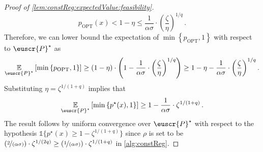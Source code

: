 \documentclass[11pt]{article}
\theoremstyle{plain}
\theoremstyle{definition}
\theoremstyle{remark}
\newcommand{\binbrace}[1]{\big\{#1\big\}}
\newcommand{\inbrace}[1]{\left\{#1\right\}}
\newcommand{\inparen}[1]{\left(#1\right)}
\newcommand{\insquare}[1]{\left[#1\right]}
\newcommand{\E}{\operatornamewithlimits{\mathbb{E}}}
\newcommand{\Ex}{\E}
\newcommand{\sfrac}[2]{{#1/#2}}
\newcommand{\nfrac}[2]{\nicefrac{#1}{#2}}
\newcommand{\opt}{\ensuremath{\mathrm{OPT}}}
\newcommand{\customcal}[1]{\euscr{#1}}
\newcommand{\cP}{\customcal{P}}
\newcommand{\cPtrue}{\cP^\star}
\begin{document}
\begin{proof}[Proof of \cref{lem:constReg:expectedValue:feasibility}]
\[{                    p_{\opt}(x) < 1-\eta
                }
                \leq {
                     \frac{1}{\alpha\sigma}  \cdot \inparen{\frac{\zeta}{\eta}}^{\sfrac{1}{q}}
                }
                \,.  
            \]
            Therefore, we can lower bound the expectation of $\min\inbrace{p_{\opt},1}$ with respect to $\cPtrue$ as
            \[
                \Ex_{\cPtrue}\insquare{\min\inbrace{p_{\opt}, 1}}
                \geq 
                    (1-\eta)\cdot \inparen{
                        1 - {  \frac{1}{\alpha\sigma}   \cdot \inparen{\frac{\zeta}{\eta}}^{\sfrac{1}{q}}}
                    }
                    \geq 1 - \eta - {  \frac{1}{\alpha\sigma}  \cdot \inparen{\frac{\zeta}{\eta}}^{\sfrac{1}{q}}}\,.
                \]
                Substituting $\eta=\zeta^{1/(1+q)}$ implies that 
            \[
                \Ex_{\cPtrue}\insquare{\min\inbrace{p^\star(x), 1}}
                    \geq 1 -  \frac{1}{\alpha\sigma}  \cdot {
                        \zeta^{\sfrac{1}{(1+q)}}
                    }\,.
            \] 
            The result follows
            by uniform convergence over $\cPtrue$ with respect to the hypothesis $\mathds{1}\binbrace{p^\star(x)\geq 1-\zeta^{1/(1+q)}}$ since $\rho$ is set to be $\inparen{\nfrac{2}{(\alpha\sigma)}} \cdot \zeta^{1/(2q)} \geq \inparen{\nfrac{1}{(\alpha\sigma)}} \cdot \zeta^{1/(1+q)}$ in \cref{alg:constReg}.
        \end{proof}
\end{document}
